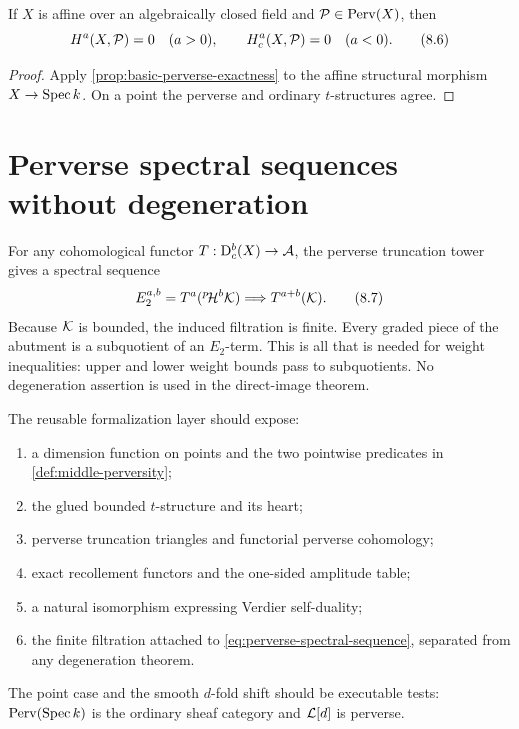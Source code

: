 \begin{corollary}
\label{cor:perverse-artin-vanishing}
If \(X\) is affine over an algebraically closed field and
\(\mathcal P\in\operatorname{Perv}(X)\), then
\[
 H^a(X,\mathcal P)=0\quad(a>0),\qquad
 H_c^a(X,\mathcal P)=0\quad(a<0).
\tag{8.6}\label{eq:perverse-artin}
\]
\end{corollary}

\begin{proof}
Apply \cref{prop:basic-perverse-exactness} to the affine structural morphism
\(X\to\operatorname{Spec} k\).  On a point the perverse and ordinary \(t\)-structures agree.
\end{proof}

\section{Perverse spectral sequences without degeneration}

For any cohomological functor \(T:\mathrm D^b_c(X)\to\mathcal A\), the perverse
truncation tower gives a spectral sequence
\[
 E_2^{a,b}=T^{a}({}^{p}\!\mathcal H^b\mathcal K)
 \Longrightarrow T^{a+b}(\mathcal K).
\tag{8.7}\label{eq:perverse-spectral-sequence}
\]
Because \(\mathcal K\) is bounded, the induced filtration is finite.  Every graded
piece of the abutment is a subquotient of an \(E_2\)-term.  This is all that is
needed for weight inequalities: upper and lower weight bounds pass to
subquotients.  No degeneration assertion is used in the direct-image theorem.

\begin{formalization}
The reusable formalization layer should expose:
\begin{enumerate}
\item a dimension function on points and the two pointwise predicates in
      \cref{def:middle-perversity};
\item the glued bounded \(t\)-structure and its heart;
\item perverse truncation triangles and functorial perverse cohomology;
\item exact recollement functors and the one-sided amplitude table;
\item a natural isomorphism expressing Verdier self-duality;
\item the finite filtration attached to
      \eqref{eq:perverse-spectral-sequence}, separated from any degeneration
      theorem.
\end{enumerate}
The point case and the smooth \(d\)-fold shift should be executable tests:
\(\operatorname{Perv}(\operatorname{Spec} k)\) is the ordinary sheaf category and \(\mathcal L[d]\) is perverse.
\end{formalization}
